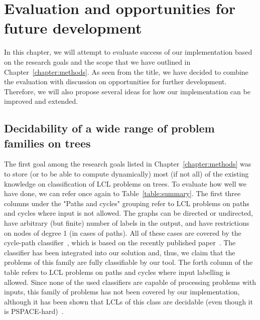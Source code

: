 \chapter{Evaluation and opportunities for future development}
\label{chapter:evaluation}

In this chapter, we will attempt to evaluate success of our implementation
based on the research goals and the scope that we have outlined in Chapter~\ref{chapter:methods}.
As seen from the title,
we have decided to combine the evaluation with discussion on opportunities for further
development. Therefore, we will also propose several ideas for how our implementation
can be improved and extended.

\section{Decidability of a wide range of problem families on trees}

The first goal among the research goals listed in Chapter~\ref{chapter:methods}
was to store (or to be able to compute dynamically) most
(if not all) of the existing knowledge on classification of LCL problems on trees.
To evaluate how well we have done, we can refer once again to Table~\ref{table:summary}.
The first three columns under the "Paths and cycles" grouping refer to LCL problems on
paths and cycles where input is not allowed. The graphs can be directed or undirected,
have arbitrary (but finite) number of labels in the output, and have restrictions
on nodes of degree 1 (in cases of paths). All of these cases are covered by
the cycle-path classifier~\cite{Tereshchenko2020}, which is based on the recently
published paper~\cite{Chang2020}. The classifier has been integrated into our
solution and, thus, we claim that the problems of this family are fully classifiable by our tool.
The forth column of the table refers to LCL problems on paths and cycles
where input labelling is allowed. Since none of the used classifiers
are capable of processing problems with inputs, this family of problems
has not been covered by our implementation, although it has been shown that
LCLs of this class are decidable (even though it is PSPACE-hard)~\cite{Balliu2018}.

